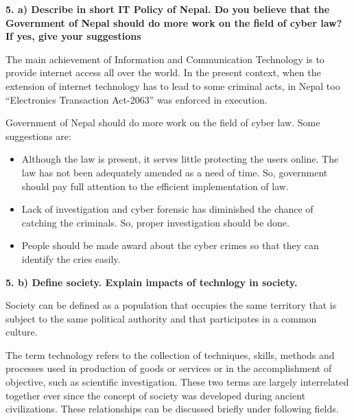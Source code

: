 \documentclass [12pt, a4paper]{article}
\begin{document}
\large
\textbf{5. a) Describe in short IT Policy of Nepal. Do you believe that the Government of Nepal should do more work on the field of cyber law? If yes, give your suggestions}\\
\normalsize

The main achievement of Information and Communication Technology is to provide internet access all over the world. In the present context, when the extension of internet technology has to lead to some criminal acts, in Nepal too “Electronics Transaction Act-2063” was enforced in execution. \\
\par
Government of Nepal should do more work on the field of cyber law. Some suggestions are: 
\begin{itemize}

	\item Although the law is present, it serves little protecting the users online. The law has not been adequately amended as a need of time. So, government should pay full attention to the efficient implementation of law.
	\item Lack of investigation and cyber forensic has diminished the chance of catching the criminals. So, proper investigation should be done.
	\item People should be made award about the cyber crimes so that they can identify the cries easily.

\end{itemize}

\large
\textbf{5. b) Define society. Explain impacts of technlogy in society.}

\normalsize
Society can be defined as a population that occupies the same territory that is subject to the same political authority and that participates in a common culture.\\
\par
The term technology refers to the collection of techniques, skills, methods and processes used in production of goods or services or in the accomplishment of objective, such as scientific investigation. These two terms are largely interrelated together ever since the concept of society was developed during ancient civilizations. These relationships can be discussed briefly under following fields.
\end{document}
